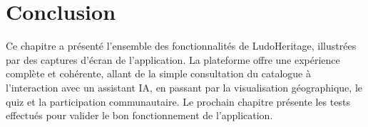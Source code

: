 \section{Conclusion}

Ce chapitre a présenté l'ensemble des fonctionnalités de LudoHeritage, illustrées par des
captures d'écran de l'application. La plateforme offre une expérience complète et cohérente,
allant de la simple consultation du catalogue à l'interaction avec un assistant IA, en passant
par la visualisation géographique, le quiz et la participation communautaire. Le prochain
chapitre présente les tests effectués pour valider le bon fonctionnement de l'application.

